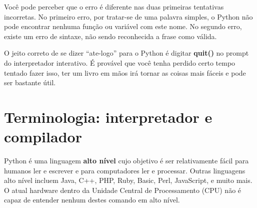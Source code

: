 %
%

Você pode perceber que o erro é diferente nas duas primeiras
tentativas incorretas. No primeiro erro, por tratar-se de uma
palavra simples, o Python não pode encontrar nenhuma função ou
variável com este nome. No segundo erro, existe um erro de sintaxe,
não sendo reconhecida a frase como válida.
%

O jeito correto de se dizer ``ate-logo'' para o Python é
digitar {\bf quit()} no prompt do interpretador interativo.
É provável que você tenha perdido certo tempo tentado fazer isso,
ter um livro em mãos irá tornar as coisas mais fáceis e
pode ser bastante útil.
%

\section{Terminologia: interpretador e compilador}
%

Python é uma linguagem {\bf alto nível} cujo objetivo é ser
relativamente fácil para humanos ler e escrever e para computadores
ler e processar. Outras linguagens alto nível incluem Java, C++,
PHP, Ruby, Basic, Perl, JavaScript, e muito mais. O atual hardware
dentro da Unidade Central de Processamento (CPU) não é capaz de entender
nenhum destes comando em alto nível.
%

